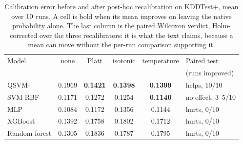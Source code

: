 \begin{table}[t]
\centering
\caption{Calibration error before and after post-hoc recalibration on KDDTest+, mean over $10$ runs. A cell is bold when its mean improves on leaving the native probability alone. The last column is the paired Wilcoxon verdict, Holm-corrected over the three recalibrators: it is what the text claims, because a mean can move without the per-run comparison supporting it.}
\label{tab:recal}
\begin{tabular}{lccccl}
\toprule
Model & none & Platt & isotonic & temperature & Paired test \\
 & & & & & (runs improved) \\
\midrule
QSVM-\ZZ{} & 0.1969 & \textbf{0.1421} & \textbf{0.1398} & \textbf{0.1399} & helps, 10/10 \\
SVM-RBF & 0.1171 & 0.1272 & 0.1254 & \textbf{0.1140} & no effect, 3--5/10 \\
MLP & 0.1084 & 0.1172 & 0.1356 & 0.1144 & hurts, 0/10 \\
XGBoost & 0.1392 & 0.1758 & 0.1802 & 0.1712 & hurts, 0/10 \\
Random forest & 0.1305 & 0.1836 & 0.1787 & 0.1795 & hurts, 0/10 \\
\bottomrule
\end{tabular}
\end{table}
